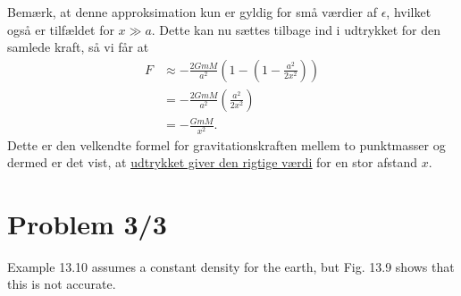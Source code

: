 \documentclass[12pt]{article}
\theoremstyle{definition}
\begin{document}
Bemærk, at denne approksimation kun er gyldig for små værdier af $\epsilon$, hvilket også er tilfældet for $x \gg a$. Dette kan nu sættes tilbage ind i udtrykket for den samlede kraft, så vi får at
\begin{align*}
  F &\approx - \frac{2 G m M}{a^2} \left( 1 - \left( 1 - \frac{a^2}{2x^2} \right) \right) \\
    &= - \frac{2G m M}{a^2} \left( \frac{a^2}{2x^2} \right) \\
    &= - \frac{G m M}{x^2}
.\end{align*}
Dette er den velkendte formel for gravitationskraften mellem to punktmasser og dermed er det vist, at \underline{\underline{udtrykket giver den rigtige værdi}} for en stor afstand $x$.


\section*{Problem 3/3}
Example 13.10 assumes a constant density for the earth, but Fig. 13.9 shows that this is not accurate.
\end{document}
